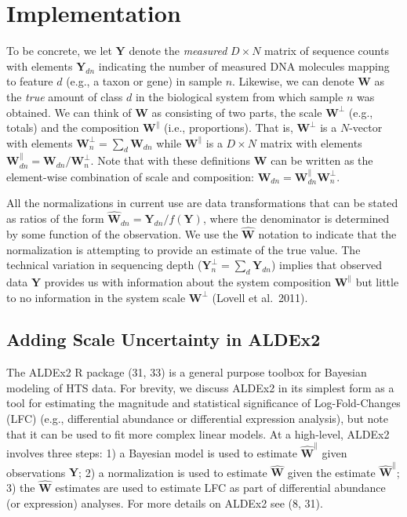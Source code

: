 \documentclass[
]{article}
\begin{document}
\section{Implementation}\label{implementation}

To be concrete, we let \(\mathbf{Y}\) denote the \emph{measured}
\(D \times N\) matrix of sequence counts with elements
\(\mathbf{Y}_{dn}\) indicating the number of measured DNA molecules
mapping to feature \(d\) (e.g., a taxon or gene) in sample \(n\).
Likewise, we can denote \(\mathbf{W}\) as the \emph{true} amount of
class \(d\) in the biological system from which sample \(n\) was
obtained. We can think of \(\mathbf{W}\) as consisting of two parts, the
scale \(\mathbf{W}^{\perp}\) (e.g., totals) and the composition
\(\mathbf{W}^{\parallel}\) (i.e., proportions). That is,
\(\mathbf{W}^{\perp}\) is a \(N\)-vector with elements
\(\mathbf{W}^{\perp}_{n}=\sum_{d}\mathbf{W}_{dn}\) while
\(\mathbf{W}^{\parallel}\) is a \(D \times N\) matrix with elements
\(\mathbf{W}^{\parallel}_{dn}=\mathbf{W}_{dn}/\mathbf{W}^{\perp}_{n}\).
Note that with these definitions \(\mathbf{W}\) can be written as the
element-wise combination of scale and composition:
\(\mathbf{W}_{dn}=\mathbf{W}^{\parallel}_{dn}\mathbf{W}^{\perp}_{n}\).

All the normalizations in current use are data transformations that can
be stated as ratios of the form
\(\hat{{\mathbf{W}}}_{dn}=\mathbf{Y}_{dn}/f(\mathbf{Y})\), where the
denominator is determined by some function of the observation. We use
the \(\hat{{\mathbf{W}}}\) notation to indicate that the normalization
is attempting to provide an estimate of the true value. The technical
variation in sequencing depth
(\(\mathbf{Y}^{\perp}_{n}=\sum_{d}\mathbf{Y}_{dn}\)) implies that
observed data \(\mathbf{Y}\) provides us with information about the
system composition \(\mathbf{W}^{\parallel}\) but little to no
information in the system scale \(\mathbf{W}^{\perp}\) (Lovell et
al.~2011).

\subsection{Adding Scale Uncertainty in
ALDEx2}\label{adding-scale-uncertainty-in-aldex2}

The ALDEx2 R package (31, 33) is a general purpose toolbox for Bayesian
modeling of HTS data. For brevity, we discuss ALDEx2 in its simplest
form as a tool for estimating the magnitude and statistical significance
of Log-Fold-Changes (LFC) (e.g., differential abundance or differential
expression analysis), but note that it can be used to fit more complex
linear models. At a high-level, ALDEx2 involves three steps: 1) a
Bayesian model is used to estimate \(\mathbf{\hat{W}}^{\parallel}\)
given observations \(\mathbf{Y}\); 2) a normalization is used to
estimate \(\mathbf{\hat{W}}\) given the estimate
\(\mathbf{\hat{W}}^{\parallel}\); 3) the \(\mathbf{\hat{W}}\) estimates
are used to estimate LFC as part of differential abundance (or
expression) analyses. For more details on ALDEx2 see (8, 31).
\end{document}
